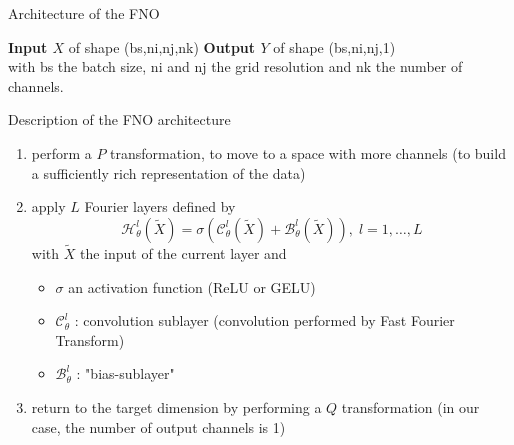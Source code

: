 \begin{frame}{Architecture of the FNO}
    \begin{center}
        \centering
    \end{center}
    \textbf{Input $X$} of shape (bs,ni,nj,nk) \qquad \qquad \textbf{Output $Y$} of shape (bs,ni,nj,1) \\
    with bs the batch size, ni and nj the grid resolution and nk the number of channels.
\end{frame}

\begin{frame}{Description of the FNO architecture}
    \begin{center}
        \centering
    \end{center}
    \begin{enumerate}[\ding{217}]
        \item perform a $P$ transformation, to move to a space with more channels (to build a sufficiently rich representation of the data)
        \item apply $L$ Fourier layers defined by
        $$\mathcal{H}_\theta^l(\tilde{X})=\sigma\left(\mathcal{C}_\theta^l(\tilde{X})+\mathcal{B}_\theta^l(\tilde{X})\right),\; l=1,\dots,L$$
        with $\tilde{X}$ the input of the current layer and
        \begin{itemize}
            \item $\sigma$ an activation function (ReLU or GELU)
            \item $\mathcal{C}_\theta^l$ : convolution sublayer (convolution performed by Fast Fourier Transform)
            \item $\mathcal{B}_\theta^l$ : "bias-sublayer"
        \end{itemize}
        \item return to the target dimension by performing a $Q$ transformation (in our case, the number of output channels is 1)
    \end{enumerate}
\end{frame}

